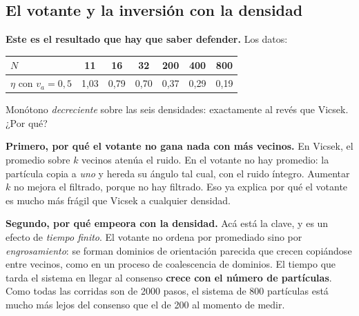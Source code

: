 \documentclass[11pt]{article}
\begin{document}
\subsection{El votante y la inversión con la densidad}
\label{sec:inversion}

\textbf{Este es el resultado que hay que saber defender.} Los datos:

\begin{center}
\begin{tabular}{lcccccc}
\toprule
$N$ & 11 & 16 & 32 & 200 & 400 & 800 \\
\midrule
$\eta$ con $v_a = 0{,}5$ & 1{,}03 & 0{,}79 & 0{,}70 & 0{,}37 & 0{,}29 & 0{,}19 \\
\bottomrule
\end{tabular}
\end{center}

Monótono \emph{decreciente} sobre las seis densidades: exactamente al revés que
Vicsek. ¿Por qué?

\textbf{Primero, por qué el votante no gana nada con más vecinos.} En Vicsek, el
promedio sobre $k$ vecinos atenúa el ruido. En el votante no hay promedio: la
partícula copia a \emph{uno} y hereda su ángulo tal cual, con el ruido íntegro.
Aumentar $k$ no mejora el filtrado, porque no hay filtrado. Eso ya explica por
qué el votante es mucho más frágil que Vicsek a cualquier densidad.

\textbf{Segundo, por qué empeora con la densidad.} Acá está la clave, y es un
efecto de \emph{tiempo finito}. El votante no ordena por promediado sino por
\emph{engrosamiento}: se forman dominios de orientación parecida que crecen
copiándose entre vecinos, como en un proceso de coalescencia de dominios. El
tiempo que tarda el sistema en llegar al consenso \textbf{crece con el número de
partículas}. Como todas las corridas son de 2000 pasos, el sistema de 800
partículas está mucho más lejos del consenso que el de 200 al momento de medir.

\end{document}
